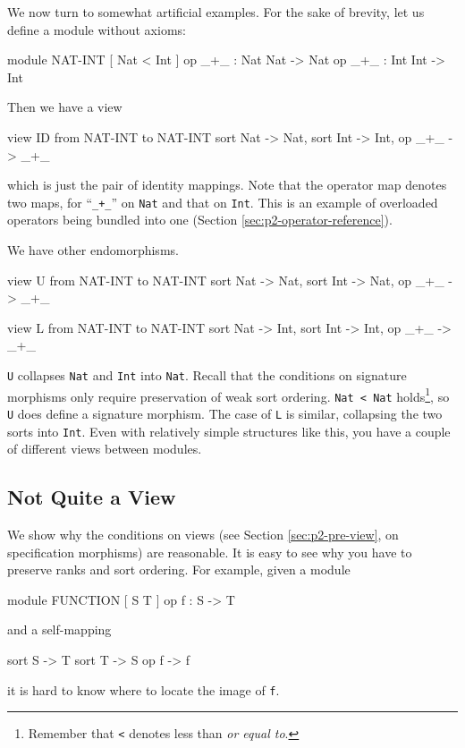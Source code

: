 \documentclass[a4paper]{memoir}
\begin{document}
We now turn to somewhat artificial examples. For the sake of brevity, let
us define a module without axioms:
\begin{vvtm}
\begin{ccode}
  module NAT-INT {
    [ Nat < Int ]
    op _+_ : Nat Nat -> Nat
    op _+_ : Int Int -> Int
  }
\end{ccode}
\end{vvtm}
Then we have a view
\begin{vvtm}
\begin{ccode}
  view ID from NAT-INT to NAT-INT {
    sort Nat -> Nat,
    sort Int -> Int,
    op _+_ -> _+_
  }
\end{ccode}
\end{vvtm}
which is just the pair of identity mappings. Note that the operator map
denotes two maps, for ``\verb|_+_|'' on \verb|Nat| and that on \verb|Int|.
This is an example of overloaded operators being bundled into one
(Section \ref{sec:p2-operator-reference}).

We have other endomorphisms.
\begin{vvtm}
\begin{ccode}
  view U from NAT-INT to NAT-INT {
    sort Nat -> Nat,
    sort Int -> Nat,
    op _+_ -> _+_
  }

  view L from NAT-INT to NAT-INT {
    sort Nat -> Int,
    sort Int -> Int,
    op _+_ -> _+_
  }
\end{ccode}
\end{vvtm}
\verb|U| collapses \verb|Nat| and \verb|Int| into \verb|Nat|. Recall that the
conditions on signature morphisms only require preservation of weak sort
ordering. \verb|Nat < Nat| holds\footnote{
Remember that \texttt{<} denotes less than \emph{or equal to}.
}, so \texttt{U} does define a signature morphism. The case of \texttt{L} is
similar, collapsing the two sorts into \texttt{Int}.
Even with relatively simple structures like this,
you have a couple of different views between modules.

\subsection{Not Quite a View}\label{sec:p2-non-view-exs}

We show why the conditions on views (see Section \ref{sec:p2-pre-view},
on specification morphisms) are reasonable.
It is easy to see why you have to preserve ranks and sort ordering.
For example, given a module
\begin{vvtm}
\begin{ccode}
  module FUNCTION {
    [ S T ]
    op f : S -> T
  } 
\end{ccode}
\end{vvtm}
and a self-mapping
\begin{vvtm}
\begin{ccode}
  sort S -> T
  sort T -> S
  op f -> f
\end{ccode}
\end{vvtm}
it is hard to know where to locate the image of \verb|f|.
\end{document}
